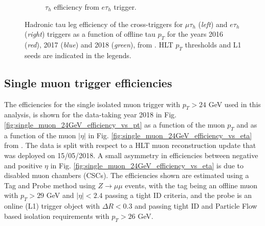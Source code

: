 \begin{figure}[h]
\begin{subfigure}{0.45\textwidth}
        \caption{$\tau_{h}$ efficiency from $e\tau_{h}$ trigger.}
        \label{fig:etauEfficiencyPt_eachYear_mediumTauMVA_Data}
    \end{subfigure}
    \caption[Hadronic tau leg efficiency of the cross-triggers for $\mu\tau_{h}$ (\textit{left}) and $e\tau_{h}$ (\textit{right}) triggers as a function of offline tau $p_{T}$ for 2016, 2017, and 2018.]{Hadronic tau leg efficiency of the cross-triggers for $\mu\tau_{h}$ (\textit{left}) and $e\tau_{h}$ (\textit{right}) triggers as a function of offline tau $p_{T}$ for the years 2016 (\textit{red}), 2017 (\textit{blue}) and 2018 (\textit{green}), from \cite{twiki_Tau_Lepton_Run_2_trigger_performance}. HLT $p_{T}$ thresholds and L1 seeds are indicated in the legends.} 
\end{figure}


\subsection{Single muon trigger efficiencies}
The efficiencies for the single isolated muon trigger with $p_{T} > 24$ GeV used in this analysis, is shown for the data-taking year 2018 in Fig. \ref{fig:single_muon_24GeV_efficiency_vs_pt} as a function of the muon $p_{T}$ and as a function of the muon $|\eta|$ in Fig. \ref{fig:single_muon_24GeV_efficiency_vs_eta} from \cite{CMS-DP-2018-034}. The data is split with respect to a HLT muon reconstruction update that was deployed on 15/05/2018. A small asymmetry in efficiencies between negative and positive $\eta$ in Fig. \ref{fig:single_muon_24GeV_efficiency_vs_eta} is due to disabled muon chambers (CSCs). The efficiencies shown are estimated using a Tag and Probe method using $Z\rightarrow \mu\mu$ events, with the tag being an offline muon with $p_{T} > 29$ GeV and $|\eta| < 2.4$ passing a tight ID criteria, and the probe is an online (L1) trigger object with $\Delta R < 0.3$ and passing tight ID and Particle Flow based isolation requirements with $p_{T} > 26$ GeV.

